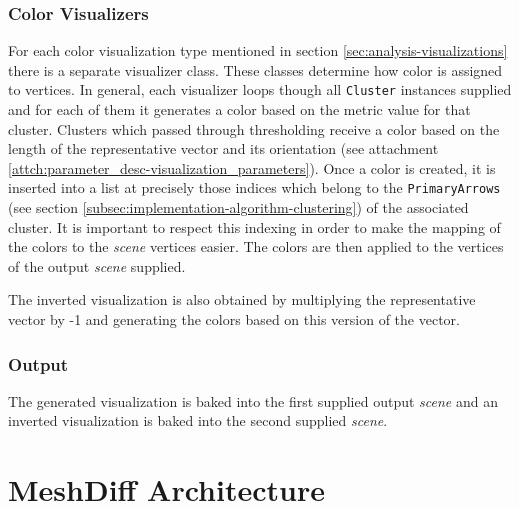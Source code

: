\subsubsection{Color Visualizers}

For each color visualization type mentioned in section \ref{sec:analysis-visualizations} there is a separate visualizer class. These classes determine how color is assigned to vertices. In general, each visualizer loops though all \verb+Cluster+ instances supplied and for each of them it generates a color based on the metric value for that cluster. Clusters which passed through thresholding receive a color based on the length of the representative vector and its orientation (see attachment \ref{attch:parameter_desc-visualization_parameters}). Once a color is created, it is inserted into a list at precisely those indices which belong to the \verb+PrimaryArrows+ (see section \ref{subsec:implementation-algorithm-clustering}) of the associated cluster. It is important to respect this indexing in order to make the mapping of the colors to the {\it scene} vertices easier. The colors are then applied to the vertices of the output {\it scene} supplied\footnotemark.

The inverted visualization is also obtained by multiplying the representative vector by -1 and generating the colors based on this version of the vector.


\subsubsection{Output}

The generated visualization is baked into the first supplied output {\it scene} and an inverted visualization is baked into the second supplied {\it scene}.
\section{MeshDiff Architecture}
\label{sec:implementation-architecture}

